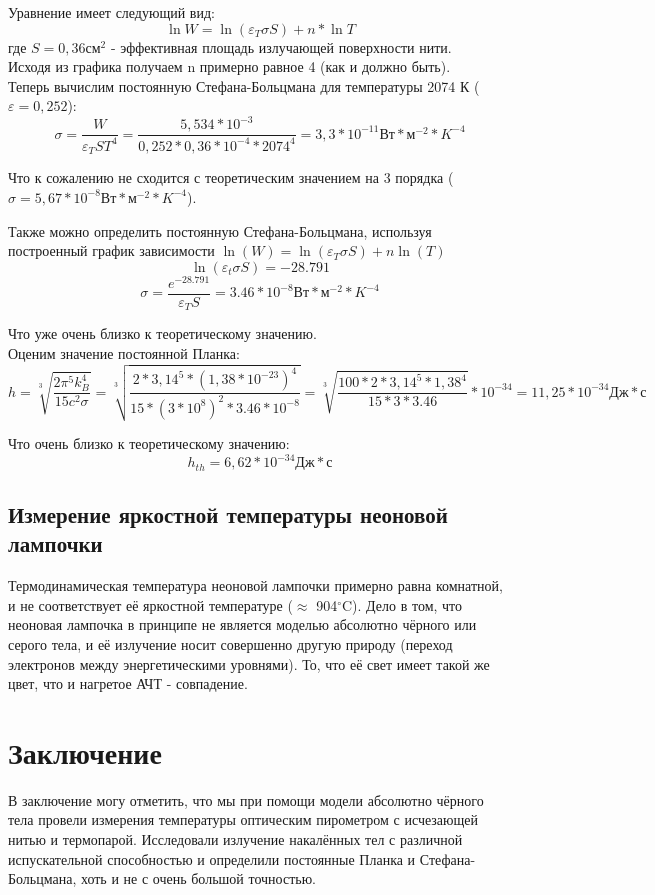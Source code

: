 \documentclass[a4paper, 12pt]{article}
\begin{document}
    Уравнение имеет следующий вид:
    \[
        \ln W = \ln(\varepsilon_{T} \sigma S) + n*\ln T
    \]
    где $S = 0,36 см^2$ - эффективная площадь излучающей поверхности нити. \\

    Исходя из графика получаем n примерно равное 4 (как и должно быть). \\

    Теперь вычислим постоянную Стефана-Больцмана для температуры 2074 К ($\varepsilon = 0,252$): 
    \[ 
        \sigma = \frac{W}{\varepsilon_{T} S T^4} = \frac{5,534 * 10^{-3}}{0,252 * 0,36 * 10^{-4} * 2074^{4}} = 3,3 * 10^{-11} Вт*м^{-2}*K^{-4}
    \]

    Что к сожалению не сходится с теоретическим значением на 3 порядка ($\sigma = 5,67 * 10^{-8} Вт*м^{-2}*K^{-4}$).

    Также можно определить постоянную Стефана-Больцмана, используя построенный график зависимости $\ln(W) = \ln(\varepsilon_T \sigma S) + n \ln(T)$
    \[    
        \ln(\varepsilon_t \sigma S) = -28.791
    \]
    \[
        \sigma = \frac{e^{-28.791}}{\varepsilon_T S} = 3.46*10^{-8} Вт*м^{-2}*K^{-4}
    \]

    Что уже очень близко к теоретическому значению. \\

    Оценим значение постоянной Планка:
    \[
        h = \sqrt[3]{\frac{2 \pi^5 k_B^4}{15 c^2 \sigma}} = \sqrt[3]{\frac{2 *3,14^5*(1,38*10^{-23})^4}{15*(3*10^8)^2*3.46*10^{-8}}} = 
        \sqrt[3]{\frac{100*2*3,14^5*1,38^4}{15*3*3.46}}*10^{-34} = 11,25*10^{-34} Дж*с
    \]

    Что очень близко к теоретическому значению: 
    \[ 
        h_{th} = 6,62 * 10^{-34} Дж*с
    \]

    \subsection{Измерение яркостной температуры неоновой лампочки}
    Термодинамическая температура неоновой лампочки примерно равна комнатной, 
    и не соответствует её яркостной температуре ($\approx$ 904$^{\circ}$C). 
    Дело в том, что неоновая лампочка в принципе не является моделью абсолютно чёрного или 
    серого тела, и её излучение носит совершенно другую природу (переход электронов между энергетическими уровнями). 
    То, что её свет имеет такой же цвет, что и нагретое АЧТ - совпадение.


\section{Заключение}
    В заключение могу отметить, что мы при помощи модели абсолютно чёрного тела провели измерения температуры оптическим пирометром с исчезающей нитью и термопарой.
    Исследовали излучение накалённых тел с различной испускательной способностью и определили постоянные Планка и Стефана-Больцмана, хоть и не с очень большой точностью.
    
\end{document}
